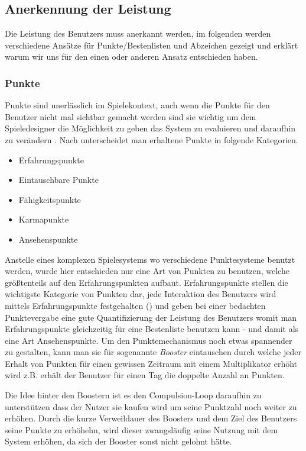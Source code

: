 \documentclass[12pt,twoside]{book}
\begin{document}
\subsection{Anerkennung der Leistung}

Die Leistung des Benutzers muss anerkannt werden, im folgenden werden verschiedene Ansätze für Punkte/Bestenlisten und Abzeichen gezeigt und erklärt warum wir uns für den einen oder anderen Ansatz entschieden haben.

\subsubsection{Punkte}
Punkte sind unerlässlich im Spielekontext, auch wenn die Punkte für den Benutzer nicht mal sichtbar gemacht werden sind sie wichtig um dem Spieledesigner die Möglichkeit zu geben das System zu evaluieren und daraufhin zu verändern \cite{zichermann2011gamification, 36}. Nach \citep{zichermann2011gamification, 38} unterscheidet man erhaltene Punkte in folgende Kategorien.

\begin{itemize}
	\item Erfahrungspunkte
    \item Eintauschbare Punkte
    \item Fähigkeitspunkte
    \item Karmapunkte
    \item Ansehenspunkte
\end{itemize}


Anstelle eines komplexen Spielesystems wo verschiedene Punktesysteme benutzt werden, wurde hier entschieden nur eine Art von Punkten zu benutzen, welche größtenteils auf den Erfahrungspunkten aufbaut. Erfahrungspunkte stellen die wichtigste Kategorie von Punkten dar, jede Interaktion des Benutzers wird mittels Erfahrungspunkte festgehalten (\citep{zichermann2011gamification, 38 - 39}) und geben bei einer bedachten Punktevergabe  eine gute Quantifizierung der Leistung des Benutzers womit man Erfahrungspunkte gleichzeitig für eine Bestenliste benutzen kann - und damit als eine Art Ansehenspunkte. Um den Punktemechanismus noch etwas spannender zu gestalten, kann man sie für sogenannte \textit{Booster} eintauschen durch welche jeder Erhalt von Punkten für einen gewissen Zeitraum mit einem Multiplikator erhöht wird z.B. erhält der Benutzer für einen Tag die doppelte Anzahl an Punkten.

Die Idee hinter den Boostern ist es den Compulsion-Loop daraufhin zu unterstützen dass der Nutzer sie kaufen wird um seine Punktzahl noch weiter zu erhöhen. Durch die kurze Verweildauer des Boosters und dem Ziel des Benutzers seine Punkte zu erhöhehn, wird dieser zwangsläufig seine Nutzung mit dem System erhöhen, da sich der Booster sonst nicht gelohnt hätte.
\end{document}

